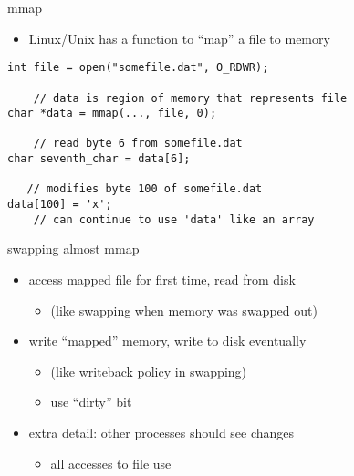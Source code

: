 \begin{frame}[fragile,label=mmap]{mmap}
\lstset{
    language=C,
    style=small
}
\begin{itemize}
\item Linux/Unix has a function to ``map'' a file to memory
\end{itemize}
\begin{lstlisting}
int file = open("somefile.dat", O_RDWR);

    // data is region of memory that represents file
char *data = mmap(..., file, 0);

    // read byte 6 from somefile.dat
char seventh_char = data[6];

   // modifies byte 100 of somefile.dat
data[100] = 'x';
    // can continue to use 'data' like an array
\end{lstlisting}
\end{frame}

\begin{frame}{swapping almost mmap}
\begin{itemize}
    \item access mapped file for first time, read from disk
        \begin{itemize}
        \item (like swapping when memory was swapped out)
        \end{itemize}
    \item write ``mapped'' memory, write to disk eventually
        \begin{itemize}
        \item (like writeback policy in swapping)
        \item use ``dirty'' bit
        \end{itemize}
    \vspace{.5cm}
    \item extra detail: other processes should see changes
        \begin{itemize}
        \item all accesses to file use 
        \end{itemize}
\end{itemize}
\end{frame}
